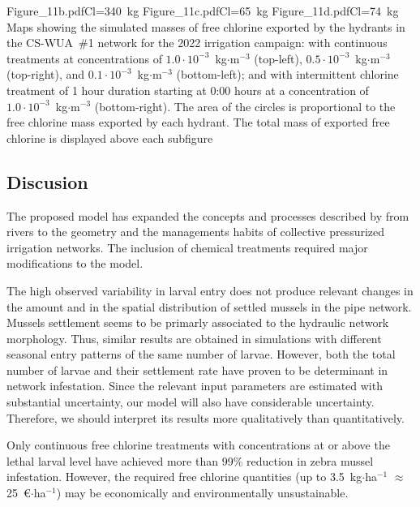 \documentclass[review,authoryear]{elsarticle}
\begin{document}
{Figure_11b.pdf}{Cl=340~kg}
{Figure_11c.pdf}{Cl=65~kg}
{Figure_11d.pdf}{Cl=74~kg}
{Maps showing the simulated masses of free chlorine exported by the hydrants in
the CS-WUA~\#1 network for the 2022 irrigation campaign: with continuous
treatments at concentrations of $1.0\cdot10^{-3}$~kg$\cdot$m$^{-3}$ (top-left),
$0.5\cdot10^{-3}$~kg$\cdot$m$^{-3}$ (top-right),  and
$0.1\cdot10^{-3}$~kg$\cdot$m$^{-3}$ (bottom-left); and with intermittent
chlorine treatment of 1 hour duration starting at 0:00 hours at a
concentration of $1.0\cdot10^{-3}$~kg$\cdot$m$^{-3}$ (bottom-right). The area of
the circles is proportional to the free chlorine mass exported by each hydrant.
The total mass of exported free chlorine is displayed above each subfigure
\label{FigExportChlorine}}

\subsection{Discusion}

The proposed model has expanded the concepts and processes described by
\citet{JinZhao21} from rivers to the geometry and the managements habits of
collective pressurized irrigation networks. The inclusion of chemical treatments
required major modifications to the model.

The high observed variability in larval entry does not produce relevant changes
in the amount and in the spatial distribution of settled mussels in the pipe
network. Mussels settlement seems to be primarly associated to the hydraulic
network morphology. Thus, similar results are obtained in simulations with
different seasonal entry patterns of the same number of larvae. However, both
the total number of larvae and their settlement rate have proven to be
determinant in network infestation. Since the relevant input parameters are
estimated with substantial uncertainty, our model will also have considerable
uncertainty. Therefore, we should interpret its results more qualitatively than
quantitatively.

Only continuous free chlorine treatments with concentrations at or above the
lethal larval level have achieved more than 99\% reduction in zebra mussel
infestation. However, the required free chlorine quantities (up to
3.5~kg$\cdot$ha$^{-1}$ $\approx$ 25~\euro{}$\cdot$ha$^{-1}$)  may be
economically and environmentally unsustainable.
\end{document}
